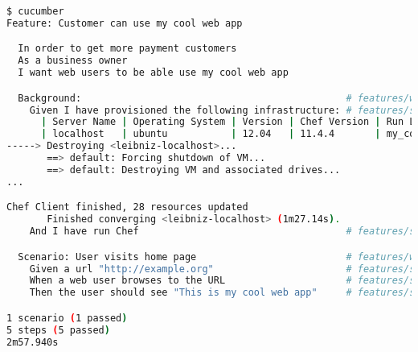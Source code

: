 \begin{lstlisting}[language=Bash,label=lst:testing-cucumber-spec2]
$ cucumber
Feature: Customer can use my cool web app

  In order to get more payment customers
  As a business owner
  I want web users to be able use my cool web app

  Background:                                              # features/working_web_page.feature:7
    Given I have provisioned the following infrastructure: # features/step_definitions/working_web_page.rb:1
      | Server Name | Operating System | Version | Chef Version | Run List             |
      | localhost   | ubuntu           | 12.04   | 11.4.4       | my_cool_app::default |
-----> Destroying <leibniz-localhost>...
       ==> default: Forcing shutdown of VM...
       ==> default: Destroying VM and associated drives...
...

Chef Client finished, 28 resources updated
       Finished converging <leibniz-localhost> (1m27.14s).
    And I have run Chef                                    # features/step_definitions/working_web_page.rb:5

  Scenario: User visits home page                          # features/working_web_page.feature:14
    Given a url "http://example.org"                       # features/step_definitions/working_web_page.rb:10
    When a web user browses to the URL                     # features/step_definitions/working_web_page.rb:14
    Then the user should see "This is my cool web app"     # features/step_definitions/working_web_page.rb:21

1 scenario (1 passed)
5 steps (5 passed)
2m57.940s
\end{lstlisting}

